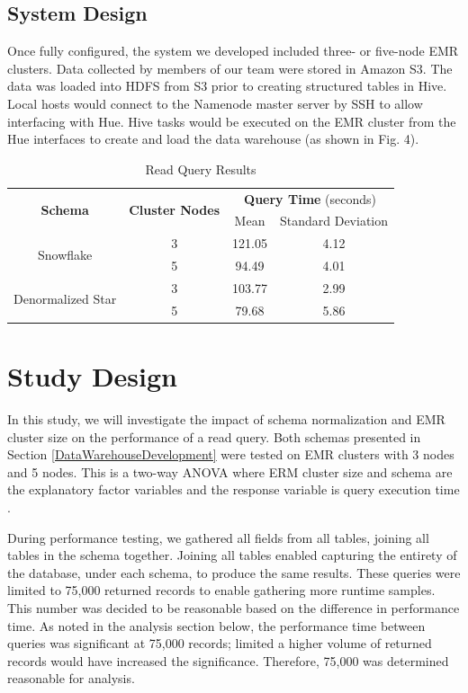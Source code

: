 \documentclass[journal]{IEEEtran}
\begin{document}
\subsection{System Design}
Once fully configured, the system we developed included three- or five-node EMR clusters.
Data collected by members of our team were stored in Amazon S3.
The data was loaded into HDFS from S3 prior to creating structured tables in Hive.
Local hosts would connect to the Namenode master server by SSH to allow interfacing with Hue.
Hive tasks would be executed on the EMR cluster from the Hue interfaces to create and load the data warehouse (as shown in Fig. 4).

\begin{table}
	\renewcommand{\arraystretch}{1.3}
	\caption{Read Query Results}
	\label{ResultsTable}
	\centering
	\begin{tabular}{c c c c}
		\hline
		\hline
		\multirow{2}{*}{\textbf{Schema}} & \multirow{2}{*}{\textbf{Cluster Nodes}} &
		\multicolumn{2}{c}{\textbf{Query Time} (seconds)}   \\
		\cline{3-4}
		&     & Mean & Standard Deviation\\
		\hline
		\multirow{2}{*}{Snowflake}         & 3   & 121.05 & 4.12 \\
		
		& 5   & 94.49 & 4.01  \\
		
		\hline
		\multirow{2}{*}{Denormalized Star} & 3   & 103.77 & 2.99 \\
		
		& 5   & 79.68 & 5.86  \\
		
		\hline
		\hline
	\end{tabular}
\end{table}

\section{Study Design}
\label{StudyDesign}

In this study, we will investigate the impact of schema normalization and
 EMR cluster size on the performance of a read query.
Both schemas presented in Section \ref{DataWarehouseDevelopment} were tested on
 EMR clusters with 3 nodes and 5 nodes.
This is a two-way ANOVA where ERM cluster size and schema
 are the explanatory factor variables and the response variable is query
 execution time \cite{RepeatMeasures}.

During performance testing, we gathered all fields from all tables,
 joining all tables in the schema together. 
Joining all tables enabled capturing the entirety of the database,
 under each schema, to produce the same results. 
These queries were limited to 75,000 returned records to enable gathering more runtime samples. 
This number was decided to be reasonable based on the difference in performance time. 
As noted in the analysis section below,
 the performance time between queries was significant at 75,000 records;
 limited a higher volume of returned records would have increased the significance. 
Therefore, 75,000 was determined reasonable for analysis.
\end{document}
